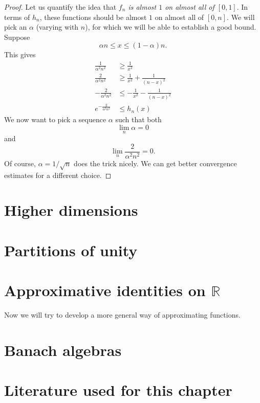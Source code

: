 \begin{proof}
Let us quantify the idea that \emph{\( f_n \) is almost \( 1 \) on almost all of \( [0,1] \)}. In terms of \( h_n \), these functions should be almost \( 1 \) on almost all of \( [0,n] \). We will pick an \( \alpha \) (varying with \( n \)), for which we will be able to establish a good bound.
Suppose
\[ 
    \alpha n \leq x \leq (1 - \alpha) n.
\]
This gives
\begin{align*}
    \frac{1}{\alpha^2n^2} &\geq \frac{1}{x^2}  \\
    \frac{2}{\alpha^2n^2} &\geq \frac{1}{x^2} + \frac{1}{(n-x)^2} \\
    -\frac{2}{\alpha^2n^2} &\leq -\frac{1}{x^2} - \frac{1}{(n-x)^2} \\
    e^{-\frac{2}{\alpha^2n^2}} &\leq  h_n(x)
\end{align*}
We now want to pick a sequence \( \alpha \) such that both
\[ 
    \lim\limits_n \alpha = 0
\]
and
\[ 
    \lim\limits_n \frac{2}{\alpha^2n^2} = 0.
\]
Of course, \( \alpha = 1/\sqrt{n} \) does the trick nicely. We can get better convergence estimates for a different choice.
\end{proof}

\section{Higher dimensions}

\section{Partitions of unity}


\section{Approximative identities on \(\mathbb{R}\)}
Now we will try to develop a more general way of approximating functions.

\section{Banach algebras}

\section{Literature used for this chapter}
